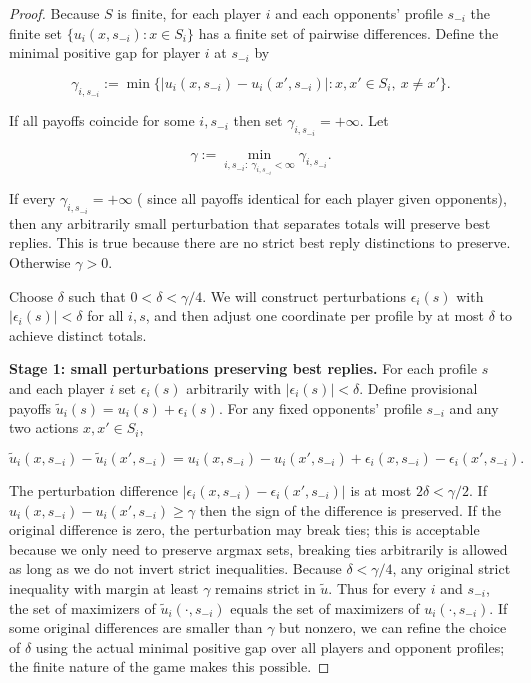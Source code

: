 \documentclass[11pt]{article}
\begin{document}
\begin{proof}
Because \(S\) is finite, for each player \(i\) and each opponents' profile
\(s_{-i}\) the finite set \(\{u_i(x,s_{-i}): x\in S_i\}\) has a finite set of
pairwise differences. Define the minimal positive gap for player \(i\) at
\(s_{-i}\) by


\[
\gamma_{i,s_{-i}} := \min\{ |u_i(x,s_{-i})-u_i(x',s_{-i})| : x,x'\in S_i,\ x\ne x'\}.
\]


If all payoffs coincide for some \(i,s_{-i}\) then set \(\gamma_{i,s_{-i}}=+\infty\). Let


\[
\gamma := \min_{i,s_{-i}:\ \gamma_{i,s_{-i}}<\infty} \gamma_{i,s_{-i}}.
\]


If every \(\gamma_{i,s_{-i}}=+\infty\) ( since all payoffs identical for each
player given opponents), then any arbitrarily small perturbation that
separates totals will preserve best replies. This is true because there are no strict best
reply distinctions to preserve. Otherwise \(\gamma>0\).

Choose \(\delta\) such that \(0<\delta<\gamma/4\). We will construct
perturbations \(\epsilon_i(s)\) with \(|\epsilon_i(s)|<\delta\) for all
\(i,s\), and then adjust one coordinate per profile by at most \(\delta\) to
achieve distinct totals.

\textbf{Stage 1: small perturbations preserving best replies.} For each
profile \(s\) and each player \(i\) set \(\epsilon_i(s)\) arbitrarily with
\(|\epsilon_i(s)|<\delta\). Define provisional payoffs
\(\tilde u_i(s)=u_i(s)+\epsilon_i(s)\). For any fixed opponents' profile
\(s_{-i}\) and any two actions \(x,x'\in S_i\),


\[
\tilde u_i(x,s_{-i})-\tilde u_i(x',s_{-i})
= u_i(x,s_{-i})-u_i(x',s_{-i}) + \epsilon_i(x,s_{-i})-\epsilon_i(x',s_{-i}).
\]


The perturbation difference \(|\epsilon_i(x,s_{-i})-\epsilon_i(x',s_{-i})|\)
is at most \(2\delta<\gamma/2\). If \(u_i(x,s_{-i})-u_i(x',s_{-i})\ge \gamma\)
then the sign of the difference is preserved. If the original difference is
zero, the perturbation may break ties; this is acceptable because we only
need to preserve argmax sets, breaking ties arbitrarily is allowed as long
as we do not invert strict inequalities. Because \(\delta<\gamma/4\), any
original strict inequality with margin at least \(\gamma\) remains strict in
\(\tilde u\). Thus for every \(i\) and \(s_{-i}\), the set of maximizers of
\(\tilde u_i(\cdot,s_{-i})\) equals the set of maximizers of \(u_i(\cdot,s_{-i})\).
If some original differences are smaller than \(\gamma\) but nonzero, we
can refine the choice of \(\delta\) using the actual minimal positive gap
over all players and opponent profiles; the finite nature of the game makes
this possible.


\end{proof}
\end{document}
